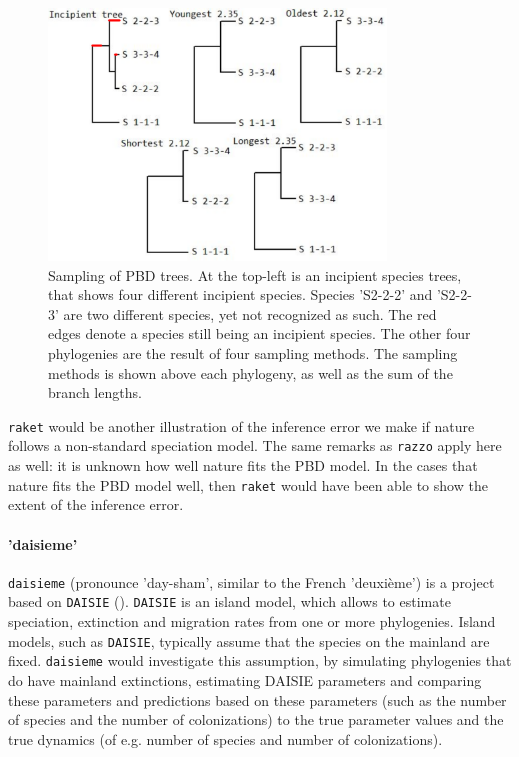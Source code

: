 \begin{figure}[]
  \includegraphics[width=0.8\textwidth]{raket_sampling_methods_modified.png}
  \caption{
    Sampling of PBD trees. At the top-left is an incipient species
    trees, that shows four different incipient species. Species
    'S2-2-2' and 'S2-2-3' are two different species, yet not recognized
    as such. The red edges denote a species still being an incipient
    species. The other four phylogenies are the result of four sampling
    methods. The sampling methods is shown above each phylogeny,
    as well as the sum of the branch lengths.
  }
  \label{fig:pbd_sampling}
\end{figure}

\verb;raket; would be another illustration of the inference error we make
if nature follows a non-standard speciation model. The same remarks as
\verb;razzo; apply here as well: it is unknown how well nature fits the PBD model.
In the cases that nature fits the PBD model well, then \verb;raket; would have
been able to show the extent of the inference error.

\paragraph{'daisieme'}

\verb;daisieme; (pronounce 'day-sham', similar to the French 'deuxième') is
a project based on \verb;DAISIE; (\cite{daisie}). \verb;DAISIE; is an island model,
which allows to estimate speciation, extinction and migration rates 
from one or more phylogenies. Island models, such as \verb;DAISIE;, typically
assume that the species on the mainland are fixed. \verb;daisieme; would
investigate this assumption, by simulating phylogenies that do have
mainland extinctions, estimating DAISIE parameters and comparing these 
parameters and predictions based on these parameters (such as the 
number of species and the number of colonizations) to the true parameter 
values and the true dynamics (of e.g. number of species and number of 
colonizations).


